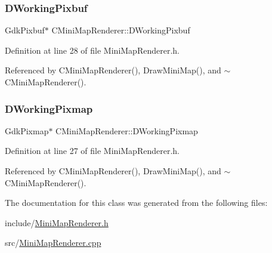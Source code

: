 \subsubsection{\texorpdfstring{D\+Working\+Pixbuf}{DWorkingPixbuf}}
{\footnotesize\ttfamily Gdk\+Pixbuf$\ast$ C\+Mini\+Map\+Renderer\+::\+D\+Working\+Pixbuf\hspace{0.3cm}{\ttfamily [protected]}}



Definition at line 28 of file Mini\+Map\+Renderer.\+h.



Referenced by C\+Mini\+Map\+Renderer(), Draw\+Mini\+Map(), and $\sim$\+C\+Mini\+Map\+Renderer().

\hypertarget{classCMiniMapRenderer_a53bf622d2048ea136ae256e8d4b81fb5}{}\label{classCMiniMapRenderer_a53bf622d2048ea136ae256e8d4b81fb5} 
\subsubsection{\texorpdfstring{D\+Working\+Pixmap}{DWorkingPixmap}}
{\footnotesize\ttfamily Gdk\+Pixmap$\ast$ C\+Mini\+Map\+Renderer\+::\+D\+Working\+Pixmap\hspace{0.3cm}{\ttfamily [protected]}}



Definition at line 27 of file Mini\+Map\+Renderer.\+h.



Referenced by C\+Mini\+Map\+Renderer(), Draw\+Mini\+Map(), and $\sim$\+C\+Mini\+Map\+Renderer().



The documentation for this class was generated from the following files\+:\begin{DoxyCompactItemize}
\item 
include/\hyperlink{MiniMapRenderer_8h}{Mini\+Map\+Renderer.\+h}\item 
src/\hyperlink{MiniMapRenderer_8cpp}{Mini\+Map\+Renderer.\+cpp}\end{DoxyCompactItemize}
